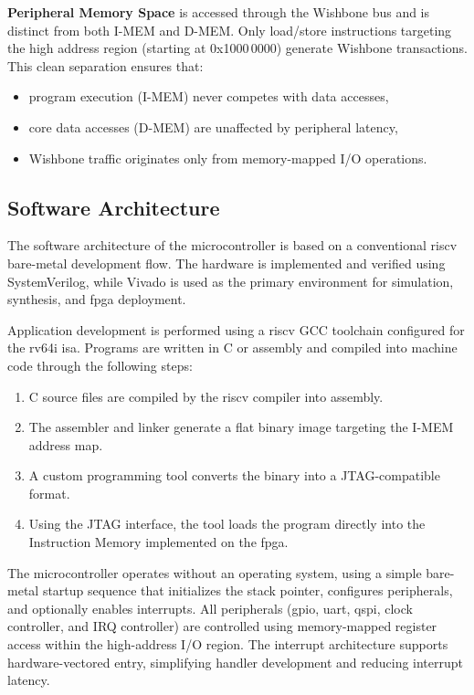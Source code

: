 \begin{itemize}
\textbf{Peripheral Memory Space} is accessed through the Wishbone bus and is distinct from both \gls{I-MEM} 
and \gls{D-MEM}. Only load/store instructions targeting the high address region (starting at 0x1000\,0000) 
generate Wishbone transactions. This clean separation ensures that:
\begin{itemize}
  \item program execution (\gls{I-MEM}) never competes with data accesses,
  \item core data accesses (\gls{D-MEM}) are unaffected by peripheral latency,
  \item Wishbone traffic originates only from memory-mapped I/O operations.
\end{itemize}

\subsection{Software Architecture}
The software architecture of the microcontroller is based on a conventional \gls{riscv} bare-metal 
development flow. The hardware is implemented and verified using SystemVerilog, while Vivado is used 
as the primary environment for simulation, synthesis, and \gls{fpga} deployment.

Application development is performed using a \gls{riscv} GCC toolchain configured for the \gls{rv64i} \gls{isa}. 
Programs are written in C or assembly and compiled into machine code through the following steps:
\begin{enumerate}
  \item C source files are compiled by the \gls{riscv} compiler into assembly.
  \item The assembler and linker generate a flat binary image targeting the \gls{I-MEM} address map.
  \item A custom programming tool converts the binary into a JTAG-compatible format.
  \item Using the JTAG interface, the tool loads the program directly into the Instruction Memory 
        implemented on the \gls{fpga}.
\end{enumerate}

The microcontroller operates without an operating system, using a simple bare-metal startup sequence 
that initializes the stack pointer, configures peripherals, and optionally enables interrupts. All 
peripherals (\gls{gpio}, \gls{uart}, \gls{qspi}, clock controller, and \gls{IRQ} controller) are controlled using 
memory-mapped register access within the high-address I/O region. The interrupt architecture supports 
hardware-vectored entry, simplifying handler development and reducing interrupt latency.


\end{itemize}
